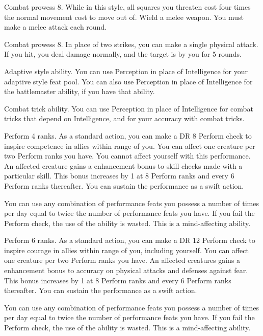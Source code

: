 \featpre Combat prowess 8.
\featben While in this style, all squares you threaten cost four times the normal movement cost to move out of.
\stylereq Wield a melee weapon.
You must make a melee attack each round.

\featpre Combat prowess 8.
\featben In place of two strikes, you can make a single physical attack.
If you hit, you deal damage normally, and the target is \taunted by you for 5 rounds.

\featpre Adaptive style ability.
\featben You can use Perception in place of Intelligence for your adaptive style feat pool.
You can also use Perception in place of Intelligence for the battlemaster ability, if you have that ability.

\featpre Combat trick ability.
\featben You can use Perception in place of Intelligence for combat tricks that depend on Intelligence, and for your accuracy with combat tricks.

\featpre Perform 4 ranks.
\featben As a standard action, you can make a DR 8 Perform check to inspire competence in allies within \rngmed range of you.
You can affect one creature per two Perform ranks you have.
You cannot affect yourself with this performance.
An affected creature gains a  enhancement bonus to skill checks made with a particular skill.
This bonus increases by 1 at 8 Perform ranks and every 6 Perform ranks thereafter.
You can sustain the performance as a swift action.

You can use any combination of performance feats you possess a number of times per day equal to twice the number of performance feats you have.
If you fail the Perform check, the use of the ability is wasted.
This is a mind-affecting ability.

\featpre Perform 6 ranks.
\featben As a standard action, you can make a DR 12 Perform check to inspire courage in allies within \rngmed range of you, including yourself.
You can affect one creature per two Perform ranks you have.
An affected creatures gains a  enhancement bonus to accuracy on physical attacks and defenses against fear.
This bonus increases by 1 at 8 Perform ranks and every 6 Perform ranks thereafter.
You can sustain the performance as a swift action.

You can use any combination of performance feats you possess a number of times per day equal to twice the number of performance feats you have.
If you fail the Perform check, the use of the ability is wasted.
This is a mind-affecting ability.

